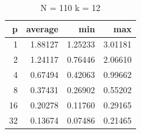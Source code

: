 \documentclass[letterpaper,twoside,11pt]{article}
\begin{document}
\begin{multicols}{2}
\begin{table}[H]
	\centering
    \begin{subtable}{.5\textwidth}
      \centering
        \begin{tabular}{*{4}{r}}
        \textbf{p} &   \textbf{average} &       \textbf{min} &       \textbf{max} \\
            \midrule
            1 & 1.88127 & 1.25233 & 3.01181\\
            2 & 1.24117 & 0.76446 & 2.06610\\
            4 & 0.67494 & 0.42063 & 0.99662\\
            8 & 0.37431 & 0.26902 & 0.55202\\
            16 & 0.20278 & 0.11760 & 0.29165\\
            32 & 0.13674 & 0.07486 & 0.21465\\
        \end{tabular}
        \caption{N = 110 k = 12}
        \label{tab:Results_naive110}
    \end{subtable}%


\end{table}
\end{multicols}
\end{document}
